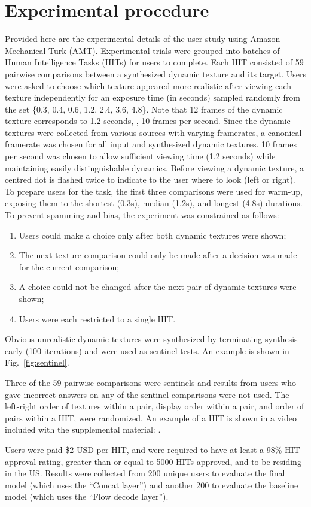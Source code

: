 \section{Experimental procedure}\label{sec:experimental_procedure}
Provided here are the experimental details of the user study
using Amazon Mechanical Turk (AMT). Experimental trials were
grouped into batches of Human Intelligence Tasks (HITs) for
users to complete. Each HIT consisted of 59 pairwise
comparisons between a synthesized dynamic texture and its target.
Users were asked to choose which texture appeared more realistic
after viewing each texture independently for an exposure time (in seconds) 
sampled randomly from the set \{0.3, 0.4, 0.6, 1.2, 2.4, 3.6, 4.8\}.
Note that 12 frames of the dynamic texture corresponds to 1.2 seconds, \ie, 10 frames per second. Since the dynamic textures were collected from various sources with varying framerates, a canonical framerate was chosen for all input and synthesized dynamic textures. 10 frames per second was chosen to allow sufficient viewing time (1.2 seconds) while maintaining easily distinguishable dynamics.
Before viewing a dynamic texture, a centred dot is flashed twice to
indicate to the user where to look (left or right).
To prepare users for the task, the first three comparisons 
were used for warm-up, exposing them to the shortest (0.3s), 
median (1.2s), and longest (4.8s) durations.
To prevent spamming and bias, the experiment was constrained as 
follows:
\begin{enumerate}
	\item Users could make a choice only after both dynamic textures were shown;
	\item The next texture comparison could only be made after a decision was made for the current comparison;
	\item A choice could not be changed after the next pair of dynamic textures were shown;
	\item Users were each restricted to a single HIT.
\end{enumerate}
Obvious unrealistic dynamic textures were synthesized by 
terminating synthesis early (100 iterations) and were used as sentinel tests. An example is shown in Fig.\ \ref{fig:sentinel}.



Three of the 59 pairwise comparisons were sentinels and results from
users who gave incorrect answers on any of the sentinel
comparisons were not used. The left-right order of textures within a pair,
display order within a pair, and order of pairs within a HIT, were randomized.
An example of a HIT is shown in a video included with the supplemental material: .

Users were paid \$2 USD per HIT, and were required to have at least
a 98\% HIT approval rating, greater than or equal to 5000 HITs
approved, and to be residing in the US. Results were collected from 200 unique 
users to evaluate the final model (which uses the ``Concat layer'') and another 200 to evaluate the baseline model (which uses the ``Flow decode layer'').